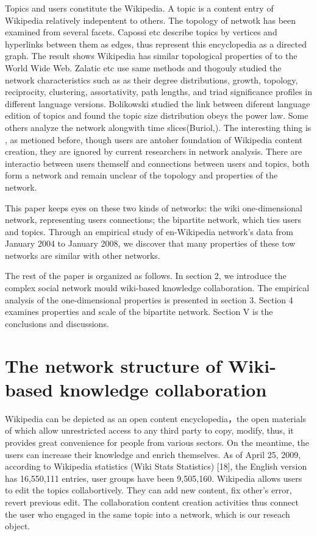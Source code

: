 \documentclass{elsarticle}
\begin{document}
Topics and users constitute the Wikipedia. A topic is a content entry
of Wikipedia relatively indepentent to others. The topology of netwotk  has
been examined
 from several facets. Capossi etc describe topics by vertices and hyperlinks between them as edges, thus represent
this encyclopedia as a directed graph. The result shows Wikipedia has
similar topological properties of to the World Wide Web. Zalatic etc use
same methods and thogouly studied the network characteristics such as as their degree distributions, growth, topology, reciprocity, clustering, assortativity, path lengths, and triad
signiﬁcance proﬁles in different language versions. Bolikowski
studied the link between diferent language edition of topics and found
the topic size distribution obeys the power law. Some others analyze
the network alongwith time slices(Buriol,). The interesting thing is
, as metioned before, though users are antoher foundation of Wikipedia
content creation, they are ignored by current researchers in network
analysis. There are interactio between users themself and connections
between users and topics, both form a network and remain unclear of the topology and
properties of the network.    



 This paper keeps eyes  on these two kinds of networks: the wiki
 one-dimensional network, representing users connections; the
 bipartite network, which ties users and topics. Through an
 empirical study of en-Wikipedia network’s data  from January
 2004 to January 2008, we discover that many properties of these tow networks are similar with other networks. 

The rest of the paper is organized as follows. In section 2, we
introduce the complex social network mould wiki-based knowledge
collaboration. The empirical analysis of the one-dimensional
properties is presented in section 3. Section 4 examines properties
and scale of the  bipartite network. Section V is
the conclusions and discussions.

\section{The network structure of Wiki-based knowledge collaboration}
\label{sec:netw-struct-wiki}

 Wikipedia
can be depicted as an open content encyclopedia，the open materials of
which allow unrestricted access to any third party to copy, modify,
thus, it  provides great convenience for people from various
sectors. On the meantime, the users can increase their knowledge and
enrich themselves. As of April 25, 2009, according to Wikipedia
statistics (Wiki Stats Statistics) [18], the English version has
16,550,111 entries, user groups have been 9,505,160. Wikipedia allows users to edit the topics collabortively. They can add
new content, fix other's error, revert previous edit. The
collaboration content creation activities thus connect the user who
engaged in the same topic into a network, which is our reseach object. 
\end{document}
